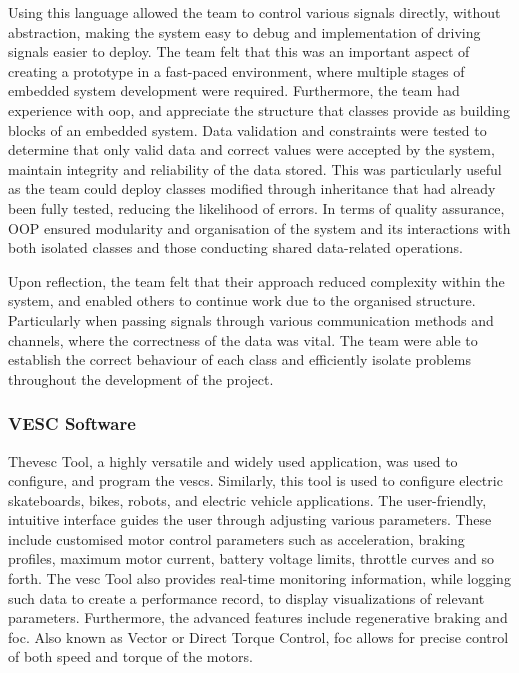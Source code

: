 \documentclass [12pt]{article}
\begin{document}
Using this language allowed the team to control various signals directly, without abstraction, making the system easy to debug and implementation of driving signals easier to deploy. The team felt that this was an important aspect of creating a prototype in a fast-paced environment, where multiple stages of embedded system development were required. Furthermore, the team had experience with \gls{oop}, and appreciate the structure that classes provide as building blocks of an embedded system. Data validation and constraints were tested to determine that only valid data and correct values were accepted by the system, maintain integrity and reliability of the data stored. This was particularly useful as the team could deploy classes modified through inheritance that had already been fully tested, reducing the likelihood of errors. In terms of quality assurance, OOP ensured modularity and organisation of the system and its interactions with both isolated classes and those conducting shared data-related operations.

Upon reflection, the team felt that their approach reduced complexity within the system, and enabled others to continue work due to the organised structure. Particularly when passing signals through various communication methods and channels, where the correctness of the data was vital. The team were able to establish the correct behaviour of each class and efficiently isolate problems throughout the development of the project.


\subsubsection{VESC Software}
The\gls{vesc} Tool, a highly versatile and widely used application, was used to configure, and program the \gls{vesc}s. Similarly, this tool is used to configure electric skateboards, bikes, robots, and electric vehicle applications. The user-friendly, intuitive interface guides the user through adjusting various parameters. These include customised motor control parameters such as acceleration, braking profiles, maximum motor current, battery voltage limits, throttle curves and so forth. The \gls{vesc} Tool also provides real-time monitoring information, while logging such data to create a performance record, to display visualizations of relevant parameters. Furthermore, the advanced features include regenerative braking and \gls{foc}. Also known as Vector or Direct Torque Control, \gls{foc} allows for precise control of both speed and torque of the motors.
\end{document}
